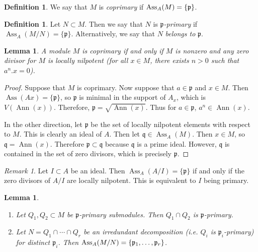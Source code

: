 \documentclass[leqno, openany]{memoir}
\newtheorem{lem}[thm]{Lemma}
\theoremstyle{definition}
\newtheorem{defn}[thm]{Definition}
\theoremstyle{remark}
\newtheorem{rmk}[thm]{Remark}
\theoremstyle{plain}
\theoremstyle{definition}
\theoremstyle{remark}
\newcommand{\mf}[1]{\mathfrak{#1}}
\DeclareMathOperator{\Ann}{Ann}
\DeclareMathOperator{\Ass}{Ass}
\begin{document}
\begin{defn} We say that $M$ is \textit{coprimary} if $\Ass_A(M) =
\qty{\mf{p}}$.  \end{defn}

\begin{defn} Let $N \subset M$. Then we say that $N$ is
\textit{$\mf{p}$-primary} if $\Ass_A(M/N) = \{ \mf{p} \}$. Alternatively, we
say that $N$ \textit{belongs to} $\mf{p}$.  \end{defn}

\begin{lem} A module $M$ is coprimary if and only if $M$ is nonzero and any
zero divisor for $M$ is locally nilpotent (for all $x \in M$, there exists $n >
0$ such that $a^n . x = 0$).  \end{lem}

\begin{proof} Suppose that $M$ is coprimary. Now suppose that $a \in \mf{p}$
    and $x \in M$. Then $\Ass(Ax) = \{ \mf{p} \}$, so $\mf{p}$ is minimal in
    the support of $A_x$, which is $V(\Ann(x))$. Therefore, $\mf{p} =
    \sqrt{\Ann(x)}$. Thus for $a \in \mf{p}$, $a^n \in \Ann(x)$.
    
    In the other direction, let $\mf{p}$ be the set of locally nilpotent
elements with respect to $M$. This is clearly an ideal of $A$. Then let $\mf{q}
\in \Ass_A(M)$. Then $x \in M$, so $\mf{q} = \Ann(x)$. Therefore $\mf{p}
\subset \mf{q}$ because $\mf{q}$ is a prime ideal. However, $\mf{q}$ is
contained in the set of zero divisors, which is precisely $\mf{p}$.
\end{proof}

\begin{rmk} Let $I \subset A$ be an ideal. Then $\Ass_A(A/I) = \{ \mf{p} \}$ if
and only if the zero divisors of $A/I$ are locally nilpotent. This is
equivalent to $I$ being primary.  \end{rmk}

\begin{lem} \begin{enumerate} \item Let $Q_1, Q_2 \subset M$ be
    $\mf{p}$-primary submodules. Then $Q_1 \cap Q_2$ is $\mf{p}$-primary.
\item Let $N = Q_1 \cap \cdots \cap Q_r$ be an irredundant decomposition (i.e.
    $Q_i$ is $\mf{p}_i$-primary) for distinct $\mf{p}_i$. Then $\Ass_A(M/N) =
    \qty{\mf{p}_1, \ldots, \mf{p}_r}$.  \end{enumerate} \end{lem}
\end{document}
